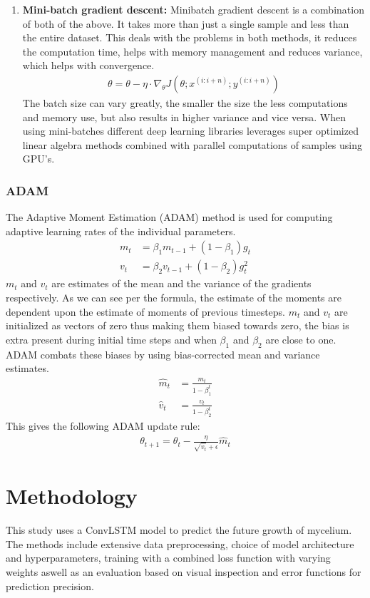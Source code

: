 \documentclass[a4paper,12pt]{article}
\begin{document}
\begin{enumerate}
  \item \textbf{Mini-batch gradient descent:}
  Minibatch gradient descent is a combination of both of the above. It takes more than just a single sample and less than the entire dataset. This deals with the problems in both methods, it reduces the computation time, helps with memory management and reduces variance, which helps with convergence.
  \begin{align}
    \theta = \theta - \eta \cdot \nabla_\theta J(\theta; x^{(i:i+n)}; y^{(i:i+n)})
  \end{align}
The batch size can vary greatly, the smaller the size the less computations and memory use, but also results in higher variance and vice versa.
When using mini-batches different deep learning libraries leverages super optimized linear algebra methods combined with parallel computations of samples using GPU's.
\end{enumerate}
\subsubsection{ADAM}
The Adaptive Moment Estimation (ADAM) method is used for computing adaptive learning rates of the individual parameters.
\begin{align}
  m_t &= \beta_1 m_{t-1} + (1 - \beta_1) g_t \\
  v_t &= \beta_2 v_{t-1} + (1 - \beta_2) g_t^2
\end{align}
$m_t$ and $v_t$ are estimates of the mean and the variance of the gradients respectively. As we can see per the formula, the estimate of the moments are dependent upon the estimate of moments of previous timesteps. $m_t$ and $v_t$ are initialized as vectors of zero thus making them biased towards zero, the bias is extra present during initial time steps and when $\beta_1$ and $\beta_2$ are close to one.
ADAM combats these biases by using bias-corrected mean and variance estimates.
\begin{align}
\hat{m}_t &= \frac{m_t}{1 - \beta_1^t} \\
\hat{v}_t &= \frac{v_t}{1 - \beta_2^t}
\end{align}
This gives the following ADAM update rule:
\begin{align}
  \theta_{t+1} = \theta_t - \frac{\eta}{\sqrt{\hat{v}_t} + \epsilon} \hat{m}_t
\end{align}
\section{Methodology}
This study uses a ConvLSTM model to predict the future growth of mycelium. The methods include extensive data preprocessing, choice of model architecture and hyperparameters, training with a combined loss function with varying weights aswell as an evaluation based on visual inspection and error functions for prediction precision.
\end{document}
